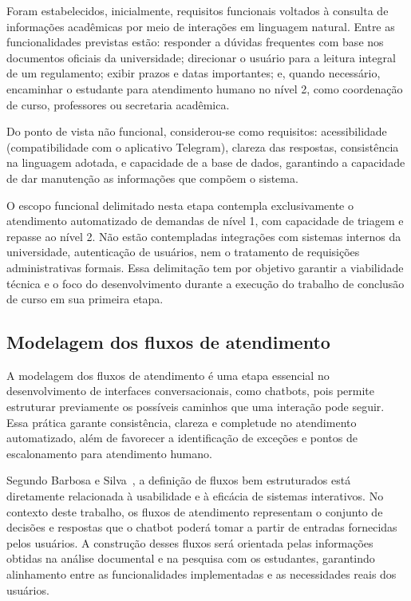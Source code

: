 Foram estabelecidos, inicialmente, requisitos funcionais voltados à consulta de informações acadêmicas por meio de interações em linguagem natural. Entre as funcionalidades previstas estão: responder a dúvidas frequentes com base nos documentos oficiais da universidade; direcionar o usuário para a leitura integral de um regulamento; exibir prazos e datas importantes; e, quando necessário, encaminhar o estudante para atendimento humano no nível 2, como coordenação de curso, professores ou secretaria acadêmica.

Do ponto de vista não funcional, considerou-se como requisitos: acessibilidade (compatibilidade com o aplicativo Telegram), clareza das respostas, consistência na linguagem adotada, e capacidade de a base de dados, garantindo a capacidade de dar manutenção as informações que compõem o sistema.

O escopo funcional delimitado nesta etapa contempla exclusivamente o atendimento automatizado de demandas de nível 1, com capacidade de triagem e repasse ao nível 2. Não estão contempladas integrações com sistemas internos da universidade, autenticação de usuários, nem o tratamento de requisições administrativas formais. Essa delimitação tem por objetivo garantir a viabilidade técnica e o foco do desenvolvimento durante a execução do trabalho de conclusão de curso em sua primeira etapa.

\subsection{Modelagem dos fluxos de atendimento}

A modelagem dos fluxos de atendimento é uma etapa essencial no desenvolvimento de interfaces conversacionais, como chatbots, pois permite estruturar previamente os possíveis caminhos que uma interação pode seguir. Essa prática garante consistência, clareza e completude no atendimento automatizado, além de favorecer a identificação de exceções e pontos de escalonamento para atendimento humano.

Segundo Barbosa e Silva~\cite{barbosa2010interacao}, a definição de fluxos bem estruturados está diretamente relacionada à usabilidade e à eficácia de sistemas interativos. No contexto deste trabalho, os fluxos de atendimento representam o conjunto de decisões e respostas que o chatbot poderá tomar a partir de entradas fornecidas pelos usuários. A construção desses fluxos será orientada pelas informações obtidas na análise documental e na pesquisa com os estudantes, garantindo alinhamento entre as funcionalidades implementadas e as necessidades reais dos usuários.

